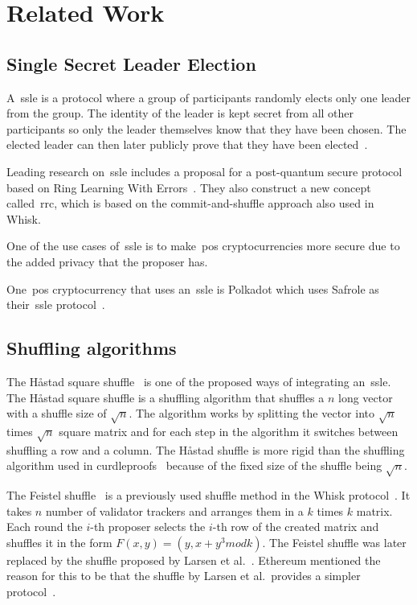 \section{Related Work}\label{sec:related-work}




\subsection{Single Secret Leader Election}\label{sec:related-work-SSLE}
A~\gls{ssle} is a protocol where a group of participants randomly elects only one leader from the group.
The identity of the leader is kept secret from all other participants so only the leader themselves know that they have been chosen.
The elected leader can then later publicly prove that they have been elected~\cite{10.1145/3419614.3423258}.

Leading research on~\gls{ssle} includes a proposal for a post-quantum secure protocol based on Ring Learning With Errors~\cite{cryptoeprint:2023/1241}.
They also construct a new concept called~\gls{rrc}, which is based on the commit-and-shuffle approach also used in Whisk.

One of the use cases of~\gls{ssle} is to make~\gls{pos} cryptocurrencies more secure due to the added privacy that the proposer has.

One~\gls{pos} cryptocurrency that uses an~\gls{ssle} is Polkadot which uses Safrole as their~\gls{ssle} protocol~\cite{safrole}.



\subsection{Shuffling algorithms}\label{subsec:related-work-shuffling-algorithm}

The Håstad square shuffle~\cite{haastad2006square} is one of the proposed ways of integrating an~\gls{ssle}.
The Håstad square shuffle is a shuffling algorithm that shuffles a $n$ long vector with a shuffle size of $\sqrt {n}$.
The algorithm works by splitting the vector into $\sqrt {n}$ times $\sqrt {n}$ square matrix and for each step in the algorithm it switches between shuffling a row and a column.
The Håstad shuffle is more rigid than the shuffling algorithm used in curdleproofs~\cite{cryptoeprint:2022/560} because of the fixed size of the shuffle being $\sqrt {n}$.

The Feistel shuffle~\cite{Feistle} is a previously used shuffle method in the Whisk protocol~\cite{Whisk2024}.
It takes $n$ number of validator trackers and arranges them in a $k$ times $k$ matrix.
Each round the $i$-th proposer selects the $i$-th row of the created matrix and shuffles it in the form $F(x,y)=(y,x+y^3 mod k)$.
The Feistel shuffle was later replaced by the shuffle proposed by Larsen et al.~\cite{cryptoeprint:2022/560}.
Ethereum mentioned the reason for this to be that the shuffle by Larsen et al.\ provides a simpler protocol~\cite{Whisk2024}.

